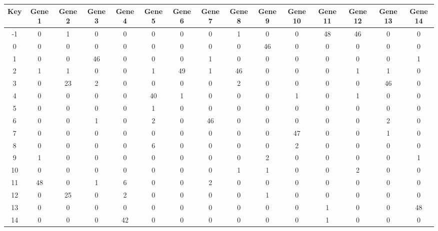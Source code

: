 \begin{tabular}{|c|c|c|c|c|c|c|c|c|c|c|c|c|c|c|}
\hline
Key & Gene 1 & Gene 2 & Gene 3 & Gene 4 & Gene 5 & Gene 6 & Gene 7 & Gene 8 & Gene 9 & Gene 10 & Gene 11 & Gene 12 & Gene 13 & Gene 14 \\
\hline
-1 & 0 & 1 & 0 & 0 & 0 & 0 & 0 & 1 & 0 & 0 & 48 & 46 & 0 & 0 \\
0 & 0 & 0 & 0 & 0 & 0 & 0 & 0 & 0 & 46 & 0 & 0 & 0 & 0 & 0 \\
1 & 0 & 0 & 46 & 0 & 0 & 0 & 1 & 0 & 0 & 0 & 0 & 0 & 0 & 1 \\
2 & 1 & 1 & 0 & 0 & 1 & 49 & 1 & 46 & 0 & 0 & 0 & 1 & 1 & 0 \\
3 & 0 & 23 & 2 & 0 & 0 & 0 & 0 & 2 & 0 & 0 & 0 & 0 & 46 & 0 \\
4 & 0 & 0 & 0 & 0 & 40 & 1 & 0 & 0 & 0 & 1 & 0 & 1 & 0 & 0 \\
5 & 0 & 0 & 0 & 0 & 1 & 0 & 0 & 0 & 0 & 0 & 0 & 0 & 0 & 0 \\
6 & 0 & 0 & 1 & 0 & 2 & 0 & 46 & 0 & 0 & 0 & 0 & 0 & 2 & 0 \\
7 & 0 & 0 & 0 & 0 & 0 & 0 & 0 & 0 & 0 & 47 & 0 & 0 & 1 & 0 \\
8 & 0 & 0 & 0 & 0 & 6 & 0 & 0 & 0 & 0 & 2 & 0 & 0 & 0 & 0 \\
9 & 1 & 0 & 0 & 0 & 0 & 0 & 0 & 0 & 2 & 0 & 0 & 0 & 0 & 1 \\
10 & 0 & 0 & 0 & 0 & 0 & 0 & 0 & 1 & 1 & 0 & 0 & 2 & 0 & 0 \\
11 & 48 & 0 & 1 & 6 & 0 & 0 & 2 & 0 & 0 & 0 & 0 & 0 & 0 & 0 \\
12 & 0 & 25 & 0 & 2 & 0 & 0 & 0 & 0 & 1 & 0 & 0 & 0 & 0 & 0 \\
13 & 0 & 0 & 0 & 0 & 0 & 0 & 0 & 0 & 0 & 0 & 1 & 0 & 0 & 48 \\
14 & 0 & 0 & 0 & 42 & 0 & 0 & 0 & 0 & 0 & 0 & 1 & 0 & 0 & 0 \\
\hline
\end{tabular}